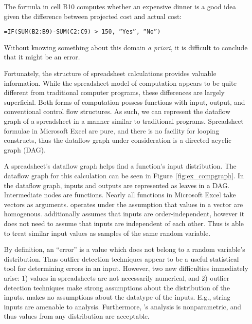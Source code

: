 The formula in cell B10 computes whether an expensive dinner is a good idea given the difference between projected cost and actual cost:

\begin{centering}
\texttt{=IF(SUM(B2:B9)-SUM(C2:C9) > 150, ``Yes'', ``No'')}
\end{centering}

Without knowing something about this domain \emph{a priori}, it is difficult to conclude that it might be an error.

Fortunately, the structure of spreadsheet calculations provides valuable information.  While the spreadsheet model of computation appears to be quite different from traditional computer programs, these differences are largely superficial.  Both forms of computation possess functions with input, output, and conventional control flow structures.  As such, we can represent the dataflow graph of a spreadsheet in a manner similar to traditional programs.  Spreadsheet formulae in Microsoft Excel are pure, and there is no facility for looping constructs, thus the dataflow graph under consideration is a directed acyclic graph (DAG).

A spreadsheet's dataflow graph helps \checkcell{} find a function's input distribution.  The dataflow graph for this calculation can be seen in Figure~\ref{fig:ex_compgraph}.  In the dataflow graph, inputs and outputs are represented as leaves in a DAG.  Intermediate nodes are functions.  Nearly all functions in Microsoft Excel take vectors as arguments.  \checkcell{} operates under the assumption that values in a vector are homogenous.  \checkcell{} additionally assumes that inputs are order-independent, however it does not need to assume that inputs are independent of each other.  Thus \checkcell{} is able to treat similar input values as samples of the same random variable.

By definition, an ``error'' is a value which does not belong to a random variable's distribution.  Thus outlier detection techniques appear to be a useful statistical tool for determining errors in an input.  However, two new difficulties immediately arise: 1) values in spreadsheets are not necessarily numerical, and 2) outlier detection techniques make strong assumptions about the distribution of the inputs.  \checkcell{} makes no assumptions about the datatype of the inputs.  E.g., string inputs are amenable to analysis.  Furthermore, \checkcell{}'s analysis is nonparametric, and thus values from any distribution are acceptable.

